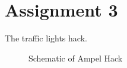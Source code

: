 \section*{Assignment 3}
The traffic lights hack.

\begin{figure}
    \begin{center}
        
        \caption{Schematic of Ampel Hack}
    \end{center}
\end{figure}
